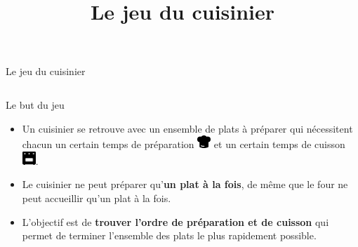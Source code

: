 \documentclass[landscape]{beamer}
\title{Le jeu du cuisinier}
\date{}
\begin{document}


\begin{frame}{Le jeu du cuisinier}



\begin{columns}
\begin{column}{0.7\textwidth}

\begin{block}{Le but du jeu}

\begin{itemize}
\item Un cuisinier se retrouve avec un ensemble de plats à préparer qui nécessitent chacun un certain temps de préparation \includegraphics[width=0.5cm]{icons/toque.png} et un certain temps de cuisson \includegraphics[width=0.5cm]{icons/four.png}. 

\item
Le cuisinier ne peut préparer qu'\textbf{un plat à la fois}, de même que le four ne peut accueillir qu'un plat à la fois.

\item
L'objectif est de \textbf{trouver l'ordre de préparation et de cuisson} qui permet de terminer l'ensemble des plats le plus rapidement possible.
\end{itemize}

\end{block}
\end{column}


\end{columns}
\end{frame}
\end{document}

